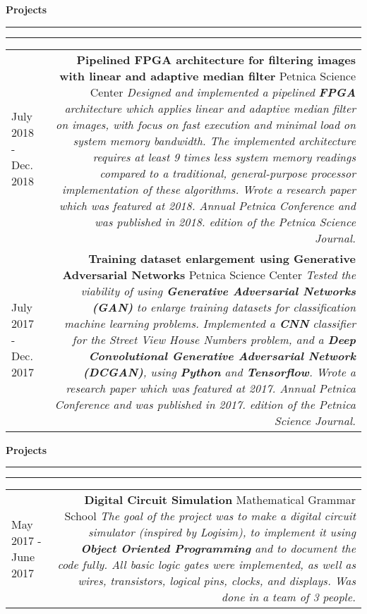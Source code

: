 \documentclass{article}
\newcommand{\mainitem}[3] {
    \textbf{#1}  \newline #2 \vskip5pt  \textit{#3} 
    \vspace{6pt}    %
}
\newenvironment{cvtable} {
	\hspace{-20pt} \begin{tabular}{L!{\color{line_color}\vrule width 1pt}D} %
} 
{\end{tabular}}
\renewcommand{\section}[1] {
    \vspace{15pt}   %
	{\color{main_color} \Large \textbf {#1}}
	{\color{line_color} \vskip-5pt \rule{\linewidth}{0.5mm}\hfill\vskip-11pt\rule{\linewidth}{0.2pt}}
	\vskip10pt  %
}
\begin{document}
    \section{Projects}
    	\begin{cvtable}
    	    \hspace{5pt} July 2018 - Dec. 2018 & 
    			\mainitem
    			    {Pipelined FPGA architecture for filtering images with linear and adaptive median filter}
    			    {Petnica Science Center} 
    			    {
    			        Designed and implemented a pipelined \textbf{FPGA} architecture which applies linear and adaptive median filter on images, with focus on fast execution and minimal load on system memory bandwidth. The implemented architecture requires at least 9 times less system memory readings compared to a traditional, general-purpose processor implementation of these algorithms. Wrote a research paper which was featured at 2018. Annual Petnica Conference and was published in 2018. edition of the Petnica Science Journal.
                    } 
    	    \\
    		\hspace{5pt} July 2017 - Dec. 2017 & 
    			\mainitem
    			    {Training dataset enlargement using Generative Adversarial Networks}
    			    {Petnica Science Center} 
    			    {
    			        Tested the viability of using \textbf{Generative Adversarial Networks (GAN)} to enlarge training datasets for classification machine learning problems. Implemented a \textbf{CNN} classifier for the Street View House Numbers problem, and a \textbf{Deep Convolutional Generative Adversarial Network (DCGAN)}, using \textbf{Python} and \textbf{Tensorflow}. Wrote a research paper which was featured at 2017. Annual Petnica Conference and was published in 2017. edition of the Petnica Science Journal.
                    }
    	\end{cvtable}
    	
    \newpage

    \section{Projects}
    	\begin{cvtable}
    		\hspace{5pt} May 2017 - June 2017 & 
    			\mainitem
    			    {Digital Circuit Simulation}
    			    {Mathematical Grammar School} 
    			    {
                        The goal of the project was to make a digital circuit simulator (inspired by Logisim), to implement it using \textbf{Object Oriented Programming} and to document the code fully. All basic logic gates were implemented, as well as wires, transistors, logical pins, clocks, and displays. Was done in a team of 3 people.
                    }
    	\end{cvtable}
\end{document}

